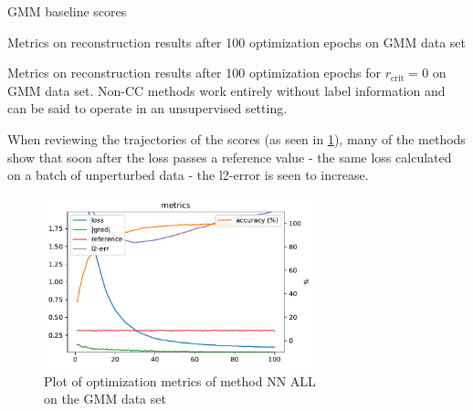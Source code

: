 \begin{table}[!htbp]
\centering
\footnotesize
{}
\caption{GMM baseline scores}
\label{tab:gmm_baseline}
\end{table}

\begin{table}[!htbp]
\centering
\footnotesize
{}
\caption{Metrics on reconstruction results after 100 optimization epochs on GMM data set}
\label{tab:gmm_results}
\end{table}

\begin{table}[!htbp]
\centering
\footnotesize
{}
\caption{Metrics on reconstruction results after 100 optimization epochs for $r_\text{crit}=0$ on GMM data set. Non-CC methods work entirely without label information and can be said to operate in an unsupervised setting.}
\label{tab:gmm_results_raw}
\end{table}


When reviewing the trajectories of the scores (as seen in \cref{fig:metrics_GMM_l2_increase}), 
many of the methods show that soon after the loss passes a reference value 
- the same loss calculated on a batch of unperturbed data - 
the l2-error is seen to increase. 


\begin{figure}[!htbp]
    \centering
    \includegraphics[width=0.7\textwidth]{figures/reconstruction_GMM_NN_ALL_metrics.pdf}
    \caption{Plot of optimization metrics of method NN ALL \\on the GMM data set}
    \label{fig:metrics_GMM_l2_increase}
\end{figure}

